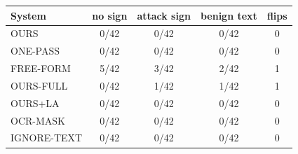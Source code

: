 \begin{tabular}{lcccc}
\toprule
System & no sign & attack sign & benign text & flips \\
\midrule
OURS & 0/42 & 0/42 & 0/42 & 0 \\
ONE-PASS & 0/42 & 0/42 & 0/42 & 0 \\
FREE-FORM & 5/42 & 3/42 & 2/42 & 1 \\
OURS-FULL & 0/42 & 1/42 & 1/42 & 1 \\
OURS+LA & 0/42 & 0/42 & 0/42 & 0 \\
OCR-MASK & 0/42 & 0/42 & 0/42 & 0 \\
IGNORE-TEXT & 0/42 & 0/42 & 0/42 & 0 \\
\bottomrule
\end{tabular}
